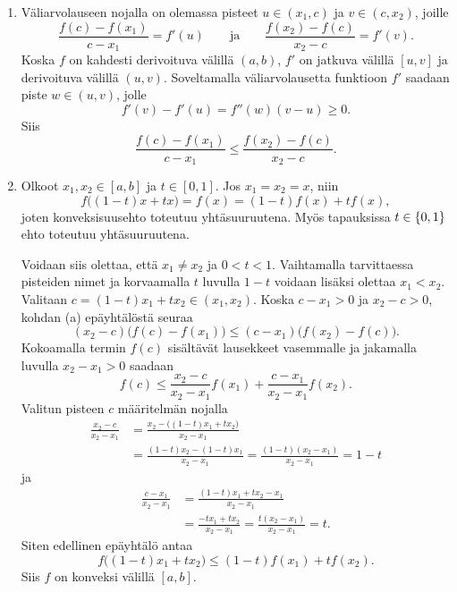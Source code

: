 \documentclass[11pt,a4paper]{amsart}
\begin{document}
\begin{solution}
  \leavevmode\par
  \begin{enumerate}[label=(\alph*)]
    \item Väliarvolauseen nojalla on olemassa pisteet
      \(u\in(x_1,c)\) ja \(v\in(c,x_2)\), joille
      \[
        \frac{f(c)-f(x_1)}{c-x_1}=f'(u)
        \qquad\text{ja}\qquad
        \frac{f(x_2)-f(c)}{x_2-c}=f'(v).
      \]
      Koska \(f\) on kahdesti derivoituva välillä \((a,b)\),
      \(f'\) on jatkuva välillä \([u,v]\) ja derivoituva välillä
      \((u,v)\). Soveltamalla väliarvolausetta funktioon \(f'\)
      saadaan piste \(w\in(u,v)\), jolle
      \[
        f'(v)-f'(u)=f''(w)(v-u)\geq 0.
      \]
      Siis
      \[
        \frac{f(c)-f(x_1)}{c-x_1}
        \leq \frac{f(x_2)-f(c)}{x_2-c}.
      \]
    \item Olkoot \(x_1,x_2\in[a,b]\) ja \(t\in[0,1]\).
      Jos \(x_1=x_2=x\), niin
      \[
        f\bigl((1-t)x+tx\bigr)=f(x)=(1-t)f(x)+tf(x),
      \]
      joten konveksisuusehto toteutuu yhtäsuuruutena. Myös tapauksissa
      \(t \in \left\lbrace0, 1\right\rbrace\) ehto toteutuu yhtäsuuruutena.

      Voidaan siis olettaa, että \(x_1\neq x_2\) ja \(0<t<1\).
      Vaihtamalla tarvittaessa pisteiden nimet ja korvaamalla
      \(t\) luvulla \(1-t\) voidaan lisäksi olettaa \(x_1<x_2\).
      Valitaan \(c=(1-t)x_1+tx_2\in(x_1,x_2)\).
      Koska \(c-x_1>0\) ja \(x_2-c>0\), kohdan (a)
      epäyhtälöstä seuraa
      \[
        (x_2-c)\bigl(f(c)-f(x_1)\bigr)
        \leq (c-x_1)\bigl(f(x_2)-f(c)\bigr).
      \]
      Kokoamalla termin \(f(c)\) sisältävät lausekkeet vasemmalle
      ja jakamalla luvulla \(x_2-x_1>0\) saadaan
      \[
        f(c)\leq
        \frac{x_2-c}{x_2-x_1}f(x_1)
        +\frac{c-x_1}{x_2-x_1}f(x_2).
      \]
      Valitun pisteen \(c\) määritelmän nojalla
      \[
        \begin{aligned}
          \frac{x_2-c}{x_2-x_1}
          &=\frac{x_2-\bigl((1-t)x_1+tx_2\bigr)}{x_2-x_1}\\
          &=\frac{(1-t)x_2-(1-t)x_1}{x_2-x_1}
          =\frac{(1-t)(x_2-x_1)}{x_2-x_1}=1-t
        \end{aligned}
      \]
      ja
      \[
        \begin{aligned}
          \frac{c-x_1}{x_2-x_1}
          &=\frac{(1-t)x_1+tx_2-x_1}{x_2-x_1}\\
          &=\frac{-tx_1+tx_2}{x_2-x_1}
          =\frac{t(x_2-x_1)}{x_2-x_1}=t.
        \end{aligned}
      \]
      Siten edellinen epäyhtälö antaa
      \[
        f\bigl((1-t)x_1+tx_2\bigr)
        \leq (1-t)f(x_1)+tf(x_2).
      \]
      Siis \(f\) on konveksi välillä \([a,b]\).
  \end{enumerate}
\end{solution}
\end{document}
